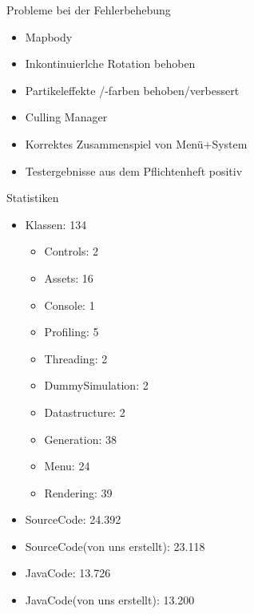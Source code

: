 \documentclass[10pt]{beamer}
\begin{document}
\begin{frame}{Probleme bei der Fehlerbehebung}
    \begin{itemize}
        \item Mapbody
        \item Inkontinuierlche Rotation behoben
        \item Partikeleffekte /-farben behoben/verbessert
        \item Culling Manager
        \item Korrektes Zusammenspiel von Menü+System
        \item Testergebnisse aus dem Pflichtenheft positiv
    \end{itemize}
\end{frame}

\begin{frame}{Statistiken}
    \begin{itemize}
        \item Klassen: 134
        \begin{itemize}
            \item Controls: 2
            \item Assets: 16
            \item Console: 1
            \item Profiling: 5
            \item Threading: 2
            \item DummySimulation: 2
            \item Datastructure: 2
            \item Generation: 38
            \item Menu: 24
            \item Rendering: 39
        \end{itemize}
        \item SourceCode: 24.392
        \item SourceCode(von uns erstellt): 23.118
        \item JavaCode: 13.726
        \item JavaCode(von uns erstellt): 13.200
        
    \end{itemize}
\end{frame}

\end{document}
